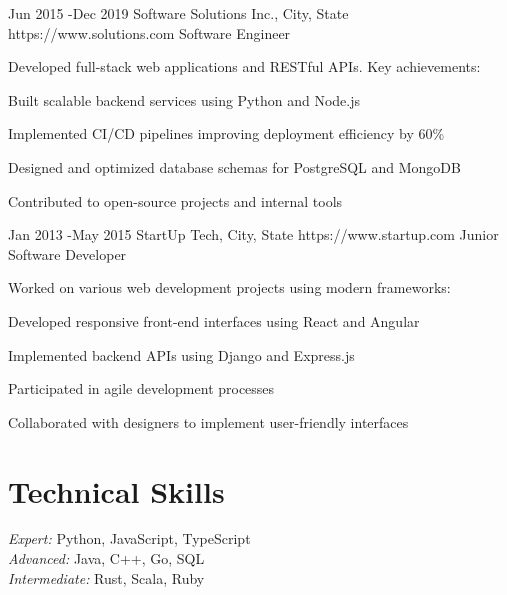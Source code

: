 \documentclass[10pt]{article} %
\begin{document}

\job
{Jun 2015 -}{Dec 2019}
{Software Solutions Inc., City, State}
{https://www.solutions.com}
{Software Engineer}
{Developed full-stack web applications and RESTful APIs. Key achievements:
\begin{itemize-noindent}
\item{Built scalable backend services using Python and Node.js}
\item{Implemented CI/CD pipelines improving deployment efficiency by 60\%}
\item{Designed and optimized database schemas for PostgreSQL and MongoDB}
\item{Contributed to open-source projects and internal tools}
\end{itemize-noindent}}


\job
{Jan 2013 -}{May 2015}
{StartUp Tech, City, State}
{https://www.startup.com}
{Junior Software Developer}
{Worked on various web development projects using modern frameworks:
\begin{itemize-noindent}
\item{Developed responsive front-end interfaces using React and Angular}
\item{Implemented backend APIs using Django and Express.js}
\item{Participated in agile development processes}
\item{Collaborated with designers to implement user-friendly interfaces}
\end{itemize-noindent}}


\section{Technical Skills}

{
\textit{Expert:} Python, JavaScript, TypeScript\\
\textit{Advanced:} Java, C++, Go, SQL\\
\textit{Intermediate:} Rust, Scala, Ruby
}

\end{document}
